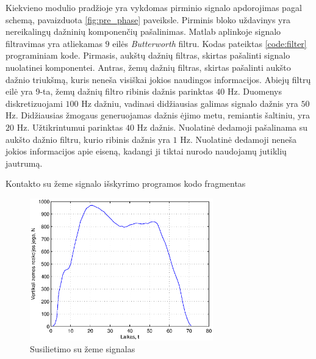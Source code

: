 \documentclass[]{vgtuef}
\begin{document}
Kiekvieno modulio pradžioje yra vykdomas pirminio signalo apdorojimas pagal schemą, pavaizduota \ref{fig:pre_phase} paveiksle. Pirminis bloko uždavinys yra nereikalingų dažninių komponenčių pašalinimas. Matlab aplinkoje signalo filtravimas yra atliekamas $9$ eilės \textit{Butterworth} filtru. Kodas pateiktas \ref{code:filter} programiniam kode. Pirmasis, aukštų dažnių filtras, skirtas pašalinti signalo nuolatinei komponentei. Antras, žemų dažnių filtras, skirtas pašalinti aukšto dažnio triukšmą, kuris neneša visiškai jokios naudingos informacijos. Abiejų filtrų eilė yra 9-ta, žemų dažnių filtro ribinis dažnis parinktas $40$ Hz. Duomenys diskretizuojami $100$ Hz dažniu, vadinasi didžiausias galimas signalo dažnis yra $50$ Hz. Didžiausias žmogaus generuojamas dažnis ėjimo metu, remiantis šaltiniu, yra $20$ Hz. Užtikrintumui parinktas $40$ Hz dažnis. Nuolatinė dedamoji pašalinama su aukšto dažnio filtru, kurio ribinis dažnis yra $1$ Hz. Nuolatinė dedamoji neneša jokios informacijos apie eiseną, kadangi ji tiktai nurodo naudojamų jutiklių jautrumą.

\begin{cfigure}
  \centering
  \caption{Kontakto su žeme signalo išskyrimo programos kodo fragmentas}
  \label{code:signal_extraction}
  
\end{cfigure}

\begin{figure}
  \centering
  \includegraphics[width=300px]{figures/09_sample_stance_phase.eps}
  \caption{Susilietimo su žeme signalas}
  \label{fig:stance_phase}
\end{figure}
\end{document}
